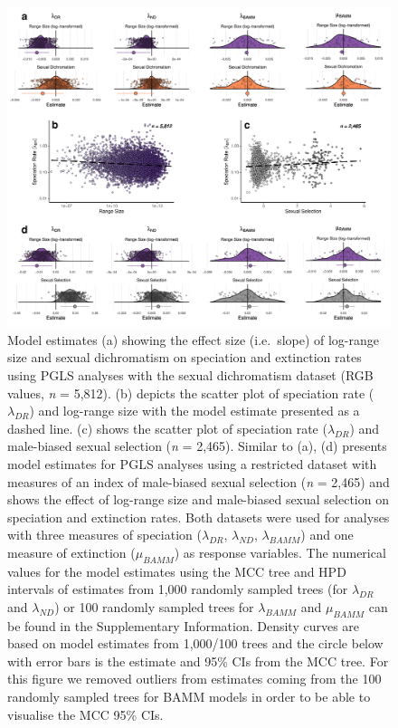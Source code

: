 \documentclass[]{article}
\begin{document}
\begin{figure}
\centering
\includegraphics{Figures/Estimates_and_scatter_edit.pdf}
\caption{Model estimates (a) showing the effect size (i.e.~slope) of
log-range size and sexual dichromatism on speciation and extinction
rates using PGLS analyses with the sexual dichromatism dataset (RGB
values, \emph{n} = 5,812). (b) depicts the scatter plot of speciation
rate (\(\lambda_{DR}\)) and log-range size with the model estimate
presented as a dashed line. (c) shows the scatter plot of speciation
rate (\(\lambda_{DR}\)) and male-biased sexual selection (\emph{n} =
2,465). Similar to (a), (d) presents model estimates for PGLS analyses
using a restricted dataset with measures of an index of male-biased
sexual selection (\emph{n} = 2,465) and shows the effect of log-range
size and male-biased sexual selection on speciation and extinction
rates. Both datasets were used for analyses with three measures of
speciation (\(\lambda_{DR}\), \(\lambda_{ND}\), \(\lambda_{BAMM}\)) and
one measure of extinction (\(\mu_{BAMM}\)) as response variables. The
numerical values for the model estimates using the MCC tree and HPD
intervals of estimates from 1,000 randomly sampled trees (for
\(\lambda_{DR}\) and \(\lambda_{ND}\)) or 100 randomly sampled trees for
\(\lambda_{BAMM}\) and \(\mu_{BAMM}\) can be found in the Supplementary
Information. Density curves are based on model estimates from 1,000/100
trees and the circle below with error bars is the estimate and 95\% CIs
from the MCC tree. For this figure we removed outliers from estimates
coming from the 100 randomly sampled trees for BAMM models in order to
be able to visualise the MCC 95\% CIs. \label{model_results}}
\end{figure}
\end{document}
